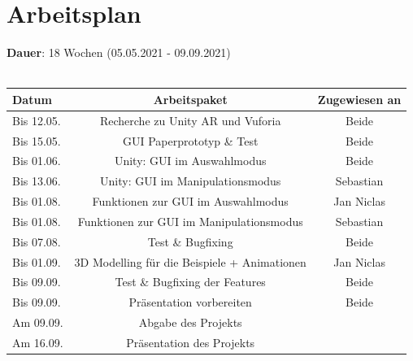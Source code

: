 \documentclass[12pt,a4paper, oneside]{scrartcl}
\begin{document}



\newpage




\section{Arbeitsplan}
\textbf{Dauer}: 18 Wochen (05.05.2021 - 09.09.2021) \\
%
\\
\begin{tabular}{|l|c|c|}
\hline
Datum & Arbeitspaket & Zugewiesen an \\
\hline
Bis 12.05. & Recherche zu Unity AR und Vuforia & Beide \\
\hline
Bis 15.05. & GUI Paperprototyp \& Test & Beide \\
\hline
Bis 01.06. & Unity: GUI im Auswahlmodus  & Beide \\
\hline
Bis 13.06. & Unity: GUI im Manipulationsmodus & Sebastian \\
\hline
Bis 01.08. & Funktionen zur GUI im Auswahlmodus & Jan Niclas \\
\hline
Bis 01.08. & Funktionen zur GUI im Manipulationsmodus & Sebastian \\
\hline
Bis 07.08. & Test \& Bugfixing & Beide \\
\hline
Bis 01.09. & 3D Modelling für die Beispiele + Animationen & Jan Niclas \\
\hline
Bis 09.09. & Test \& Bugfixing der Features & Beide \\
\hline
Bis 09.09. & Präsentation vorbereiten & Beide \\
\hline
Am  09.09. & Abgabe des Projekts & \\
\hline
Am  16.09. & Präsentation des Projekts & \\
\hline
\end{tabular}



\newpage





\end{document}
